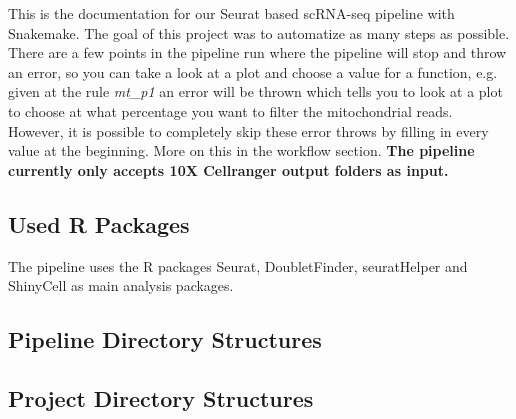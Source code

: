 This is the documentation for our Seurat based scRNA-seq pipeline with Snakemake.
The goal of this project was to automatize as many steps as possible.
There are a few points in the pipeline run where the pipeline will stop and throw an error, so you can take a look at a plot and choose a value for a function, e.g. given at the rule \textit{mt\_p1} an error will be thrown which tells you to look at a plot to choose at what percentage you want to filter the mitochondrial reads. However, it is possible to completely skip these error throws by filling in every value at the beginning. More on this in the workflow section. \textbf{The pipeline currently only accepts 10X Cellranger output folders as input.}

\subsection{Used R Packages}
The pipeline uses the R packages Seurat, DoubletFinder, seuratHelper and ShinyCell as main analysis packages.

\subsection{Pipeline Directory Structures}
\begin{minipage}{0.35\textwidth}
\end{minipage}\hfill
\begin{minipage}{0.55\textwidth}
\end{minipage}

\subsection{Project Directory Structures}
\begin{minipage}{0.45\textwidth}
\end{minipage}\hfill
\begin{minipage}{0.45\textwidth}
\end{minipage}